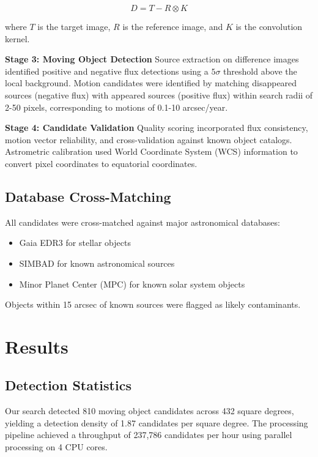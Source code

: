 \documentclass[twocolumn]{aastex631}
\begin{document}
\begin{equation}
D = T - R \otimes K
\end{equation}

where $T$ is the target image, $R$ is the reference image, and $K$ is the convolution kernel.

\textbf{Stage 3: Moving Object Detection}
Source extraction on difference images identified positive and negative flux detections using a $5\sigma$ threshold above the local background. Motion candidates were identified by matching disappeared sources (negative flux) with appeared sources (positive flux) within search radii of 2-50 pixels, corresponding to motions of 0.1-10 arcsec/year.

\textbf{Stage 4: Candidate Validation}
Quality scoring incorporated flux consistency, motion vector reliability, and cross-validation against known object catalogs. Astrometric calibration used World Coordinate System (WCS) information to convert pixel coordinates to equatorial coordinates.

\subsection{Database Cross-Matching}

All candidates were cross-matched against major astronomical databases:
\begin{itemize}
    \item Gaia EDR3 \citep{2021A&A...649A...1G} for stellar objects
    \item SIMBAD \citep{2000A&AS..143....9W} for known astronomical sources  
    \item Minor Planet Center (MPC) for known solar system objects
\end{itemize}

Objects within 15 arcsec of known sources were flagged as likely contaminants.

\section{Results} \label{sec:results}

\subsection{Detection Statistics}

Our search detected 810 moving object candidates across 432 square degrees, yielding a detection density of 1.87 candidates per square degree. The processing pipeline achieved a throughput of 237,786 candidates per hour using parallel processing on 4 CPU cores.
\end{document}
